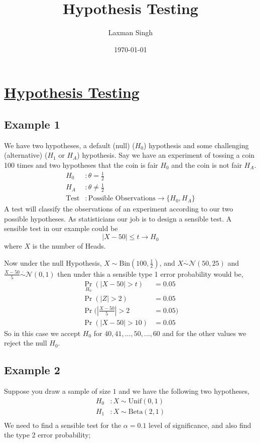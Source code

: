 \documentclass[12pt,a4paper,fleqn]{article}
\author{Laxman Singh}
\date{\today}
\title{Hypothesis Testing}
\begin{document}
\section{\underline{Hypothesis Testing}}
  \subsection{Example 1}  
We have two hypotheses, a default (null) (\(H_{0}\)) hypothesis and some challenging (alternative) (\(H_{1}\) or \(H_{A}\)) hypothesis.
Say we have an experiment of tossing a coin 100 times and two hypotheses that the coin is fair \(H_{0}\)  and the coin is not fair \(H_{A}\).  
\begin{align*}
    H_{0} & : \theta =\frac{1}{2}\\
    H_{A} & : \theta \neq \frac{1}{2}\\
    \text{Test} & : \text{Possible Observations} \to \{H_{0},H_{A}\}
\end{align*}
A test will classify the observations of an experiment according to our two possible hypotheses.
As statisticians our job is to design a sensible test.
A sensible test in our example could be \[|X - 50| \leq t \to H_{0}\]
where \(X\) is the number of Heads.  

Now under the null Hypothesis, \(X \sim \text{Bin}(100,\frac{1}{2}) \), and \(X \overset{\cdot}{\sim} \mathcal{N}(50,25)\) and \(\frac{X-50}{5} \overset{\cdot}{\sim} \mathcal{N}(0,1)\) then under this a sensible type 1 error probability would be,
\begin{align*}
    \Pr_{H_{0}}(|X-50| > t) &=0.05\\
    \Pr (|Z|>2) &= 0.05 \\
    \Pr \bigg( \left|\frac{X-50}{5}\right| > 2 &= 0.05\bigg) \\
    \Pr (|X-50| > 10) &= 0.05
\end{align*}  
So in this case we accept \(H_{0}\) for \(40,41,\ldots,50,\ldots,60\) and for the other values we reject the null \(H_{0}\).  

 \subsection{Example 2} 

Suppose you draw a sample of size \(1\) and we have the following two hypotheses,
\begin{align*}
    H_{0} &: X \sim \text{Unif}(0,1)\\
    H_{1} &: X \sim \text{Beta}(2,1)\\
\end{align*} 
We need to find a sensible test for the \(\alpha = 0.1\) level of significance, and also find the type 2 error probability; 
\end{document}
